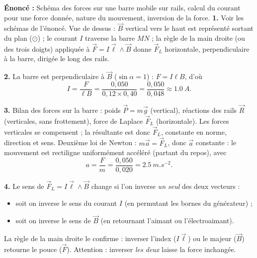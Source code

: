 \documentclass[11pt]{article}
\newcommand{\cle}[1]{{\popxbold\color{popdark}#1}}
\begin{document}
\begin{corrige}
\textbf{Énoncé :} Schéma des forces sur une barre mobile sur rails, calcul du courant pour une force donnée, nature du mouvement, inversion de la force.
\tcblower
\textbf{1.} Voir les schémas de l'énoncé. Vue de dessus : $\vec{B}$ vertical vers le haut est représenté sortant du plan ($\odot$) ; le courant $I$ traverse la barre $MN$ ; la règle de la main droite (ou des trois doigts) appliquée à $\vec{F} = I\vec{\ell}\wedge\vec{B}$ donne $\vec{F}_L$ horizontale, perpendiculaire à la barre, dirigée le long des rails.

\textbf{2.} La barre est perpendiculaire à $\vec{B}$ ($\sin\alpha = 1$) : $F = I\ell B$, d'où
\[ I = \frac{F}{\ell B} = \frac{0{,}050}{0{,}12 \times 0{,}40} = \frac{0{,}050}{0{,}048} \approx \SI{1,0}{A}. \]

\textbf{3.} Bilan des forces sur la barre : poids $\vec{P} = m\vec{g}$ (vertical), réactions des rails $\vec{R}$ (verticales, sans frottement), force de Laplace $\vec{F}_L$ (horizontale). Les forces verticales se compensent ; la résultante est donc $\vec{F}_L$, constante en norme, direction et sens.
Deuxième loi de Newton : $m\vec{a} = \vec{F}_L$, donc $\vec{a}$ constante : le mouvement est \cle{rectiligne uniformément accéléré} (partant du repos), avec
\[ a = \frac{F}{m} = \frac{0{,}050}{0{,}020} = \SI{2,5}{m.s^{-2}}. \]

\textbf{4.} Le sens de $\vec{F}_L = I\vec{\ell}\wedge\vec{B}$ change si l'on inverse \emph{un seul} des deux vecteurs :
\begin{itemize}
\item soit on inverse le sens du courant $I$ (en permutant les bornes du générateur) ;
\item soit on inverse le sens de $\vec{B}$ (en retournant l'aimant ou l'électroaimant).
\end{itemize}
La règle de la main droite le confirme : inverser l'index ($I\vec{\ell}$) ou le majeur ($\vec{B}$) retourne le pouce ($\vec{F}$). Attention : inverser \emph{les deux} laisse la force inchangée.
\end{corrige}
\end{document}
